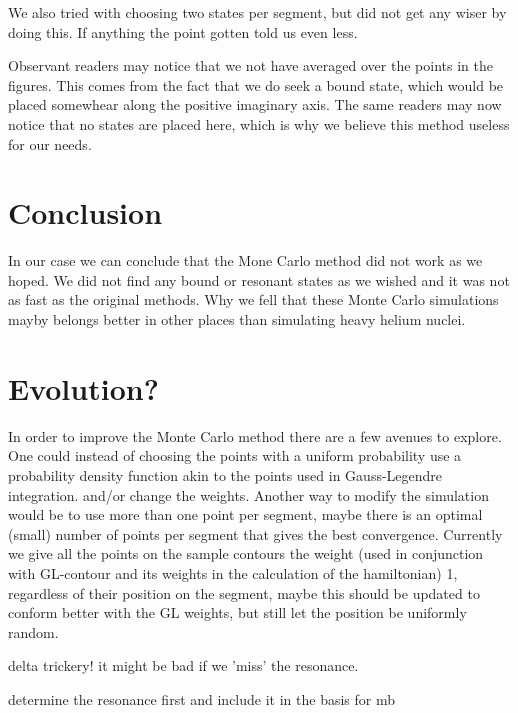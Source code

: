 We also tried with choosing two states per segment, but did not get any wiser by doing this.
If anything the point gotten told us even less.

Observant readers may notice that we not have averaged over the points in the figures.
This comes from the fact that we do seek a bound state, which would be placed somewhear along the positive imaginary axis.
The same readers may now notice that no states are placed here, which is why we believe this method useless for our needs.

\section{Conclusion}
In our case we can conclude that the Mone Carlo method did not work as we hoped.
We did not find any bound or resonant states as we wished and it was not as fast as the original methods.
Why we fell that these Monte Carlo simulations mayby belongs better in other places than simulating heavy helium nuclei.

\section{Evolution?}
In order to improve the Monte Carlo method there are a few avenues to explore.
One could instead of choosing the points with a uniform probability use a probability density function akin to the points used in Gauss-Legendre integration. 
and/or change the weights.
Another way to modify the simulation would be to use more than one point per segment, maybe there is an optimal (small) number of points per segment that gives the best convergence. 
Currently we give all the points on the sample contours the weight (used in conjunction with GL-contour and its weights in the calculation of the hamiltonian) 1, regardless of their position on the segment, maybe this should be updated to conform better with the GL weights, but still let the position be uniformly random.

delta trickery! it might be bad if we 'miss' the resonance.

determine the resonance first and include it in the basis for mb